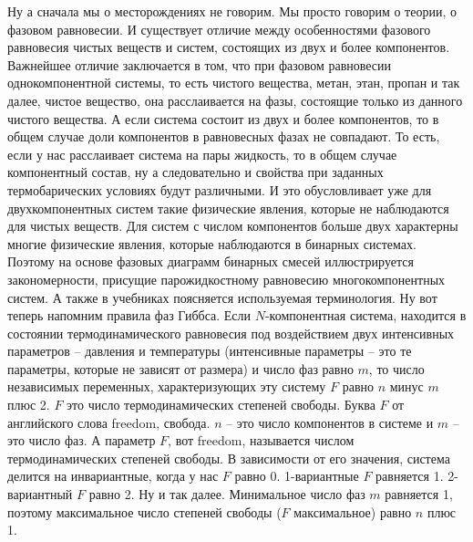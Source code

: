 \documentclass[main.tex]{subfiles}
\begin{document}
Ну а сначала мы о месторождениях не говорим.
Мы просто говорим о теории, о фазовом равновесии.
И существует отличие между особенностями фазового равновесия чистых веществ и систем, состоящих из двух и более компонентов.
Важнейшее отличие заключается в том, что при фазовом равновесии однокомпонентной системы, то есть чистого вещества, метан, этан, пропан и так далее, чистое вещество, она расслаивается на фазы, состоящие только из данного чистого вещества.
А если система состоит из двух и более компонентов, то в общем случае доли компонентов в равновесных фазах не совпадают.
То есть, если у нас расслаивает система на пары жидкость,
то в общем случае компонентный состав, ну а следовательно и свойства при заданных термобарических условиях будут различными.
И это обусловливает уже для двухкомпонентных систем такие физические явления, которые не наблюдаются для чистых веществ.
Для систем с числом компонентов больше двух характерны
многие физические явления, которые наблюдаются в бинарных
системах.
Поэтому на основе фазовых диаграмм бинарных смесей иллюстрируется закономерности, присущие парожидкостному равновесию многокомпонентных систем.
А также в учебниках поясняется используемая терминология.
Ну вот теперь напомним правила фаз Гиббса.
Если $N$-компонентная система, находится в состоянии термодинамического равновесия под воздействием двух интенсивных параметров -- давления и температуры (интенсивные параметры -- это те параметры, которые не зависят от размера) и число фаз равно $m$, то число независимых переменных, характеризующих эту систему $F$ равно $n$ минус $m$ плюс 2.
$F$ это число термодинамических степеней свободы.
Буква $F$ от английского слова freedom, свобода.
$n$ -- это число компонентов в системе и $m$ -- это число фаз.
А параметр $F$, вот freedom, называется числом термодинамических
степеней свободы.
В зависимости от его значения, система делится на инвариантные,
когда у нас $F$ равно 0.
1-вариантные $F$ равняется 1.
2-вариантный $F$ равно 2.
Ну и так далее.
Минимальное число фаз $m$ равняется 1, поэтому максимальное число степеней свободы ($F$ максимальное) равно $n$ плюс 1.
\end{document}
